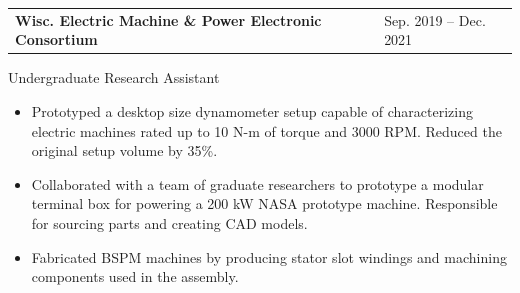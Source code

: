 \begin{tabular}{@{}p{4in}>{\raggedleft\arraybackslash}p{1.5in}}
{\bf Wisc. Electric Machine \& Power Electronic Consortium} & Sep. 2019 -- Dec. 2021\\
\end{tabular}
Undergraduate Research Assistant
\begin{itemize}
\setlength\itemsep{0.25em}
\item Prototyped a desktop size dynamometer setup capable of characterizing electric machines rated up to 10 N-m of torque and 3000 RPM. Reduced the original setup volume by 35\%.
\item Collaborated with a team of graduate researchers to prototype a modular terminal box for powering a 200 kW NASA prototype machine. Responsible for sourcing parts and creating CAD models. 
\item Fabricated BSPM machines by producing stator slot windings and machining components used in the assembly.
\end{itemize}

